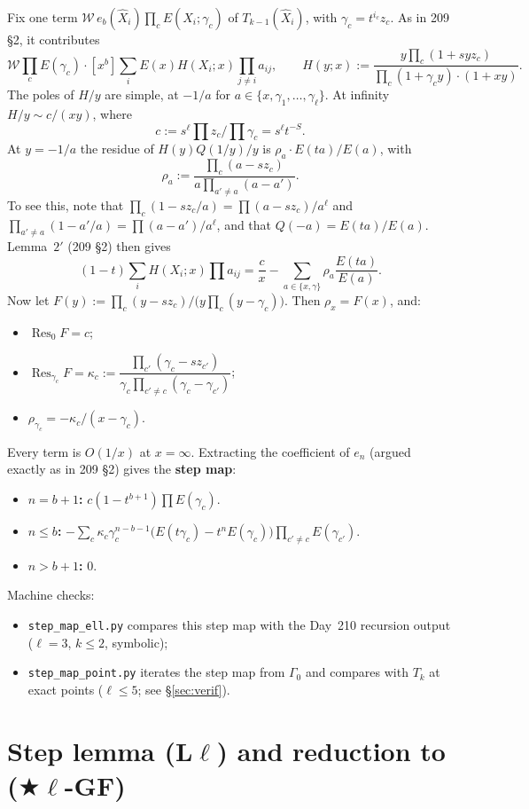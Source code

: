 \documentclass[11pt]{amsart}
\theoremstyle{remark}
\newcommand{\hX}{\widehat{X}}
\newcommand{\cW}{\mathcal{W}}
\newcommand{\Res}{\operatorname*{Res}}
\begin{document}
Fix one term $\cW\,e_b(\hX_i)\prod_cE(\hX_i;\gamma_c)$ of $T_{k-1}(\hX_i)$, with $\gamma_c=t^{i_c}z_c$. As in 209 \S2, it contributes
\[
\cW\prod_cE(\gamma_c)\cdot[x^b]\sum_iE(x)H(X_i;x)\prod_{j\ne i}a_{ij},\qquad
H(y;x):=\frac{y\prod_c(1+syz_c)}{\prod_c(1+\gamma_cy)\cdot(1+xy)}.
\]
The poles of $H/y$ are simple, at $-1/a$ for $a\in\{x,\gamma_1,\dots,\gamma_\ell\}$. At infinity $H/y\sim c/(xy)$, where
\[
c:=s^\ell\prod z_c\Big/\prod\gamma_c=s^\ell t^{-S}.
\]
At $y=-1/a$ the residue of $H(y)Q(1/y)/y$ is $\rho_a\cdot E(ta)/E(a)$, with
\[
\rho_a:=\frac{\prod_c(a-sz_c)}{a\prod_{a'\ne a}(a-a')}.
\]
To see this, note that $\prod_c(1-sz_c/a)=\prod(a-sz_c)/a^\ell$ and $\prod_{a'\ne a}(1-a'/a)=\prod(a-a')/a^\ell$, and that $Q(-a)=E(ta)/E(a)$. Lemma~$2'$ (209 \S2) then gives
\[
(1-t)\sum_iH(X_i;x)\prod a_{ij}=\frac cx-\sum_{a\in\{x,\gamma\}}\rho_a\frac{E(ta)}{E(a)}.
\]
Now let $F(y):=\prod_c(y-sz_c)\big/\bigl(y\prod_c(y-\gamma_c)\bigr)$. Then $\rho_x=F(x)$, and:
\begin{itemize}
\item $\Res_0F=c$;
\item $\Res_{\gamma_c}F=\kappa_c:=\dfrac{\prod_{c'}(\gamma_c-sz_{c'})}{\gamma_c\prod_{c'\ne c}(\gamma_c-\gamma_{c'})}$;
\item $\rho_{\gamma_c}=-\kappa_c/(x-\gamma_c)$.
\end{itemize}
Every term is $O(1/x)$ at $x=\infty$. Extracting the coefficient of $e_n$ (argued exactly as in 209 \S2) gives the \textbf{step map}:
\begin{itemize}
\item \textbf{$n=b+1$:} $c(1-t^{b+1})\prod E(\gamma_c)$.
\item \textbf{$n\le b$:} $-\sum_c\kappa_c\gamma_c^{n-b-1}\bigl(E(t\gamma_c)-t^nE(\gamma_c)\bigr)\prod_{c'\ne c}E(\gamma_{c'})$.
\item \textbf{$n>b+1$:} $0$.
\end{itemize}
Machine checks:
\begin{itemize}
\item \texttt{step\_map\_ell.py} compares this step map with the Day~210 recursion output ($\ell=3$, $k\le2$, symbolic);
\item \texttt{step\_map\_point.py} iterates the step map from $\Gamma_0$ and compares with $T_k$ at exact points ($\ell\le5$; see \S\ref{sec:verif}).
\end{itemize}

\section{Step lemma (L\texorpdfstring{$\ell$}{l}) and reduction to (\texorpdfstring{$\bigstar\ell$}{*l}-GF)}\label{sec:L}
\end{document}
